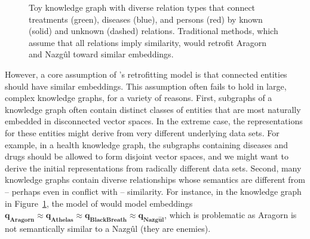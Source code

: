 \documentclass[11pt, a4paper]{article}
\begin{document}
\begin{figure}[htb]
    \centering

    \caption{Toy knowledge graph with diverse relation types that connect treatments (green), diseases (blue), and persons (red) by known (solid) and unknown (dashed) relations. %
    Traditional methods, which assume that all relations imply similarity, would retrofit Aragorn and Nazg\^{u}l toward similar embeddings.}
    \label{fig:toy_graph}
\end{figure}


However, a core assumption of 's retrofitting model is that connected entities should have similar embeddings. This assumption often fails to hold in large, complex knowledge graphs, for a variety of reasons. First, subgraphs of a knowledge graph often contain distinct classes of entities that are most naturally embedded in disconnected vector spaces. In the extreme case, the representations for these entities might derive from very different underlying data sets. For example, in a health knowledge graph, the subgraphs containing diseases and drugs should be allowed to form disjoint vector spaces, and we might want to derive the initial representations from radically different data sets. Second, many knowledge graphs contain diverse relationships whose semantics are different from -- perhaps even in conflict with -- similarity.  For instance, in the knowledge graph in Figure~\ref{fig:toy_graph}, the model of  would model embeddings $\boldsymbol{q_{Aragorn}} \approx \boldsymbol{q_{Athelas}} \approx \boldsymbol{q_{Black Breath}} \approx \boldsymbol{q_{Nazg\hat{u}l}}$, which is problematic as Aragorn is not semantically similar to a Nazg\^{u}l (they are enemies).
\end{document}
